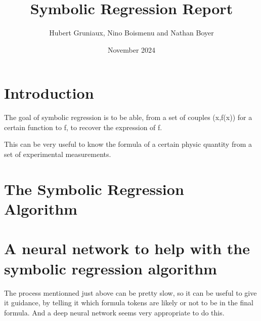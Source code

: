 \documentclass{article}
\title{Symbolic Regression Report}
\author{Hubert Gruniaux, Nino Boismenu and Nathan Boyer}
\date{November 2024}
\begin{document}
\maketitle

\section*{Introduction}

The goal of symbolic regression is to be able, from a set of couples (x,f(x)) for a certain function to f,
to recover the expression of f.

This can be very useful to know the formula of a certain physic quantity from a set of experimental measurements.

\section{The Symbolic Regression Algorithm}

\section{A neural network to help with the symbolic regression algorithm}

The process mentionned just above can be pretty slow, so it can be useful to give it guidance, by telling it which
formula tokens are likely or not to be in the final formula. And a deep neural network seems very appropriate to do this.
\end{document}
